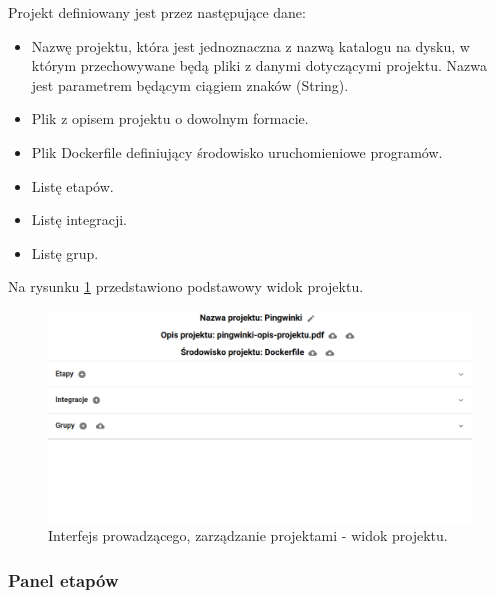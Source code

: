 Projekt definiowany jest przez następujące dane:
\begin {itemize}
    \item Nazwę projektu, która jest jednoznaczna z nazwą katalogu na dysku, w którym przechowywane będą pliki z danymi dotyczącymi projektu.
    Nazwa jest parametrem będącym ciągiem znaków (String).
    \item Plik z opisem projektu o dowolnym formacie.
    \item Plik Dockerfile definiujący środowisko uruchomieniowe programów.
    \item Listę etapów.
    \item Listę integracji.
    \item Listę grup.
\end {itemize}

Na rysunku \ref{fig:lecturer_project_board} przedstawiono podstawowy widok projektu.

\begin{figure}[h]
    \centering
    \includegraphics[width = 13cm]{chapter04/lecturer_project_board.png}
    \caption{Interfejs prowadzącego, zarządzanie projektami - widok projektu.}
    \label{fig:lecturer_project_board}
\end{figure}

\subsubsection{Panel etapów}

